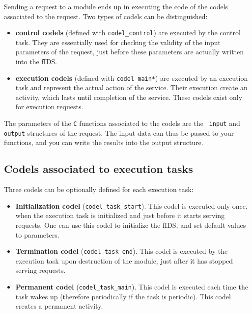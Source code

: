 Sending a request to a module ends up in executing the code of the codels
associated to the request. Two types of codels can be distinguished:

\begin{itemize}
\item \textbf{control codels} (defined with \texttt{codel\_control}) are
executed by the control task. They are essentially  used for checking the
validity    of the input parameters of    the  request, just before these
parameters are actually written into the fIDS.

\item \textbf{execution codels} (defined with \texttt{codel\_main*}) are
executed by  an execution task  and  represent the actual  action of  the
service.    Their execution  create   an  activity,   which lasts   until
completion  of  the service.   These  codels  exist   only for  execution
requests.
\end{itemize}

The parameters of the \texttt{C} functions associated to  the codels are the
\texttt{ input} and \texttt{output} structures  of  the request. The input data
can thus be passed to your functions, and you can  write the results into
the output structure.


\subsection{Codels associated to execution tasks}

Three codels can be optionally defined for each execution task:

\begin{itemize}
\item \textbf{Initialization codel} (\texttt{codel\_task\_start}). This codel is
executed  only once, when  the  execution task   is initialized and  just
before it starts serving requests.  One can use  this codel to initialize
the fIDS, and set default values to parameters.

\item \textbf{Termination codel} (\texttt{codel\_task\_end}). This codel is
executed by the execution task upon destruction of the module, just after
it has stopped serving requests.

\item \textbf{Permanent codel} (\texttt{codel\_task\_main}). This codel is executed
each  time  the task  wakes  up (therefore  periodically  if  the task is
periodic). This codel creates a permanent activity.
\end{itemize}


